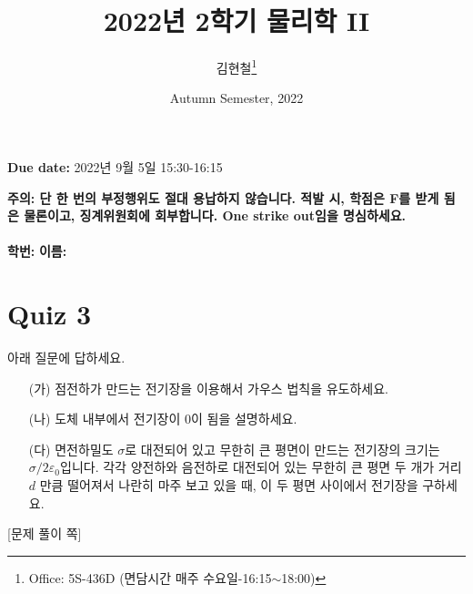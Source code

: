 \documentclass[tightenlines,floatfix,nofootinbib,superscriptaddress,fleqn]{revtex4}
\begin{document}
\title{\Large 2022년 2학기 물리학 II}
\author{김현철\footnote{Office: 5S-436D (면담시간 매주
    수요일-16:15$\sim$18:00)}} 
\date{Autumn Semester, 2022}

\maketitle

{\color{red} {\bf Due date:} 2022년 9월 5일  15:30-16:15 }
\vspace{1.cm}

\noindent \textbf{ 주의: \color{blue} 단 한 번의 부정행위도 절대
  용납하지 않습니다. 적발 시, 학점은 F를 받게 됨은 물론이고,
  징계위원회에 회부합니다. One strike out임을 명심하세요.} 
\\
\\

{\bf 학번:} \hspace{4cm}
{\bf 이름:} 

\section*{\large Quiz 3}
 아래 질문에 답하세요.
\begin{itemize}
\item[(가)] 점전하가 만드는 전기장을 이용해서 가우스 법칙을 유도하세요.
\item[(나)] 도체 내부에서 전기장이 0이 됨을 설명하세요.
\item[(다)] 면전하밀도 $\sigma$로 대전되어 있고 무한히 큰 평면이 
  만드는 전기장의 크기는 $\sigma/2\varepsilon_0$입니다. 각각 양전하와
  음전하로 대전되어 있는 무한히 큰 평면 두 개가 거리 $d$ 만큼 떨어져서
  나란히 마주 보고 있을 때, 이 두 평면 사이에서 전기장을 구하세요. 
\end{itemize}

\newpage
{\color{gray} [문제 풀이 쪽]}
\newpage
\end{document}
